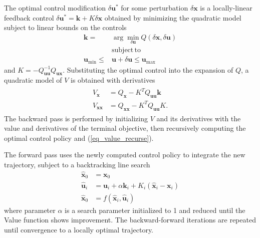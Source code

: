 \documentclass[journal ]{new-aiaa}
\newcommand{\state}{\ensuremath{\mathbf{x}}}
\newcommand{\control}{\ensuremath{\mathbf{u}}}
\begin{document}
The optimal control modification $\delta\control^*$ for some perturbation $\delta\state$ is a locally-linear feedback control $\delta\control^* = \mathbf{k} + K\delta\state$ obtained by minimizing the quadratic model subject to linear bounds on the controls
\begin{align}
\mathbf{k} = &\arg\min_{\delta\control} Q(\delta\state,\delta\control) \\
&\mathrm{subject\,to\,\;} \nonumber\\
\control_{\min}\le&\control+\delta\control \le\control_{\max}
\end{align}
and $K = -Q_{\control\control}^{-1}Q_{\control\state}$. Substituting the optimal control into the expansion of $Q$, a quadratic model of $V$ is obtained with derivatives
\begin{align}
\begin{split}
\label{eq_value_recurse}
V_\state &= Q_{\state}- K^TQ_{\control\control}\mathbf{k}\\
V_{\state\state} &= Q_{\state\state} - K^TQ_{\control\control}K.
\end{split}
\end{align}
The backward pass is performed by initializing $V$ and its derivatives with the value and derivatives of the terminal objective, then recursively computing the optimal control policy and (\ref{eq_value_recurse}).

The forward pass uses the newly computed control policy to integrate the new trajectory, subject to a backtracking line search
\begin{align}
\hat{\state}_0 &= \state_0 \\
\hat{\control}_{i} &= \control_i + \alpha \mathbf{k}_i + K_i(\hat{\state}_i - \state_i)\\
\hat{\state}_0 &= f(\hat{\state}_i,\hat{\control}_i)
\end{align}
where parameter $\alpha$ is a search parameter initialized to 1 and reduced until the Value function shows improvement. The backward-forward iterations are repeated until convergence to a locally optimal trajectory.
\end{document}
